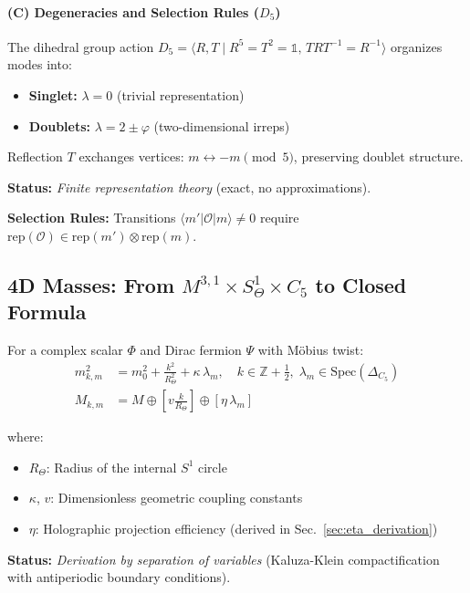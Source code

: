 \documentclass[12pt]{article}
\begin{document}
\paragraph{(C) Degeneracies and Selection Rules ($D_5$)}

The dihedral group action $D_5 = \langle R, T \mid R^5 = T^2 = \mathbb{1},\, TRT^{-1} = R^{-1} \rangle$ organizes modes into:
\begin{itemize}
\item \textbf{Singlet:} $\lambda = 0$ (trivial representation)
\item \textbf{Doublets:} $\lambda = 2 \pm \varphi$ (two-dimensional irreps)
\end{itemize}

Reflection $T$ exchanges vertices: $m \leftrightarrow -m \pmod{5}$, preserving doublet structure.

\textbf{Status:} \textit{Finite representation theory} (exact, no approximations).

\textbf{Selection Rules:} Transitions $\langle m' | \mathcal{O} | m \rangle \neq 0$ require $\text{rep}(\mathcal{O}) \in \text{rep}(m') \otimes \text{rep}(m)$.

\subsection{4D Masses: From $M^{3,1} \times S^1_\Theta \times C_5$ to Closed Formula}

For a complex scalar $\Phi$ and Dirac fermion $\Psi$ with M\"obius twist:
\begin{align}
m^2_{k,m} &= m_0^2 + \frac{k^2}{R_\Theta^2} + \kappa \, \lambda_m, \quad k \in \mathbb{Z} + \tfrac{1}{2},\; \lambda_m \in \text{Spec}(\Delta_{C_5}) \label{eq:mass-scalar-full} \\
M_{k,m} &= M \oplus \left[v \frac{k}{R_\Theta}\right] \oplus \left[\eta \, \lambda_m\right] \label{eq:mass-fermion-full}
\end{align}

where:
\begin{itemize}
\item $R_\Theta$: Radius of the internal $S^1$ circle
\item $\kappa$, $v$: Dimensionless geometric coupling constants
\item $\eta$: Holographic projection efficiency (derived in Sec.~\ref{sec:eta_derivation})
\end{itemize}

\textbf{Status:} \textit{Derivation by separation of variables} (Kaluza-Klein compactification with antiperiodic boundary conditions).
\end{document}
